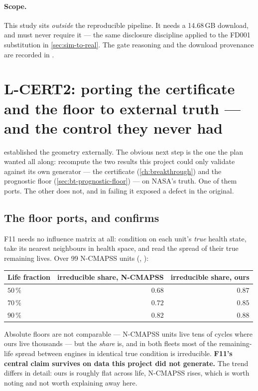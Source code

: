 \paragraph{Scope.} This study sits \emph{outside} the reproducible pipeline. It needs a
14.68\,GB download, and  must never require it --- the same disclosure discipline
applied to the FD001 substitution in \cref{sec:sim-to-real}. The gate reasoning and the download
provenance are recorded in .

\section{L-CERT2: porting the certificate and the floor to external truth --- and the control they never had}
\label{sec:f21-port}

 established the geometry externally. The obvious next step is the one
the plan wanted all along: recompute the two results this project could only validate against
its own generator --- the certificate (\cref{ch:breakthrough}) and the prognostic floor
(\cref{sec:bt-prognostic-floor}) --- on NASA's truth. One of them ports. The other does not, and
in failing it exposed a defect in the original.

\subsection{The floor ports, and confirms}

F11 needs no influence matrix at all: condition on each unit's \emph{true} health state, take
its nearest neighbours in health space, and read the spread of their true remaining lives. Over
99 N-CMAPSS units (, ):

\begin{center}\small
\begin{tabular}{@{}lrr@{}}
  \toprule
  Life fraction & irreducible share, N-CMAPSS & irreducible share, ours \\
  \midrule
  $50\,\%$ & $0.68$ & $0.87$ \\
  $70\,\%$ & $0.72$ & $0.85$ \\
  $90\,\%$ & $0.82$ & $0.88$ \\
  \bottomrule
\end{tabular}
\end{center}

Absolute floors are not comparable --- N-CMAPSS units live tens of cycles where ours live
thousands --- but the \emph{share} is, and in both fleets most of the remaining-life spread
between engines in identical true condition is irreducible. \textbf{F11's central claim
survives on data this project did not generate.} The trend differs in detail: ours is roughly
flat across life, N-CMAPSS rises, which is worth noting and not worth explaining away here.

